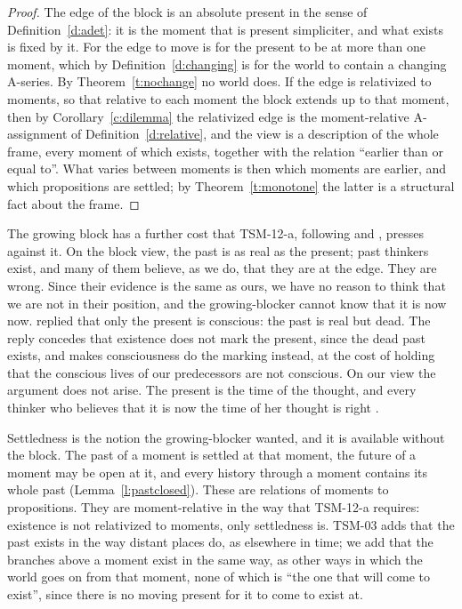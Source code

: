 \documentclass{situationist-preprint}
\begin{document}
\begin{proof}
The edge of the block is an absolute present in the sense of Definition~\ref{d:adet}: it is the moment that is present simpliciter, and what exists is fixed by it. For the edge to move is for the present to be at more than one moment, which by Definition~\ref{d:changing} is for the world to contain a changing A-series. By Theorem~\ref{t:nochange} no world does. If the edge is relativized to moments, so that relative to each moment the block extends up to that moment, then by Corollary~\ref{c:dilemma} the relativized edge is the moment-relative A-assignment of Definition~\ref{d:relative}, and the view is a description of the whole frame, every moment of which exists, together with the relation \enquote{earlier than or equal to}. What varies between moments is then which moments are earlier, and which propositions are settled; by Theorem~\ref{t:monotone} the latter is a structural fact about the frame.
\end{proof}

The growing block has a further cost that TSM-12-a, following \citet{Bourne2002} and \citet{BraddonMitchell2004}, presses against it. On the block view, the past is as real as the present; past thinkers exist, and many of them believe, as we do, that they are at the edge. They are wrong. Since their evidence is the same as ours, we have no reason to think that we are not in their position, and the growing-blocker cannot know that it is now now. \citet{Forrest2004} replied that only the present is conscious: the past is real but dead. The reply concedes that existence does not mark the present, since the dead past exists, and makes consciousness do the marking instead, at the cost of holding that the conscious lives of our predecessors are not conscious. On our view the argument does not arise. The present is the time of the thought, and every thinker who believes that it is now the time of her thought is right \citep{Mellor1998}.

Settledness is the notion the growing-blocker wanted, and it is available without the block. The past of a moment is settled at that moment, the future of a moment may be open at it, and every history through a moment contains its whole past (Lemma~\ref{l:pastclosed}). These are relations of moments to propositions. They are moment-relative in the way that TSM-12-a requires: existence is not relativized to moments, only settledness is. TSM-03 adds that the past exists in the way distant places do, as elsewhere in time; we add that the branches above a moment exist in the same way, as other ways in which the world goes on from that moment, none of which is \enquote{the one that will come to exist}, since there is no moving present for it to come to exist at.
\end{document}
